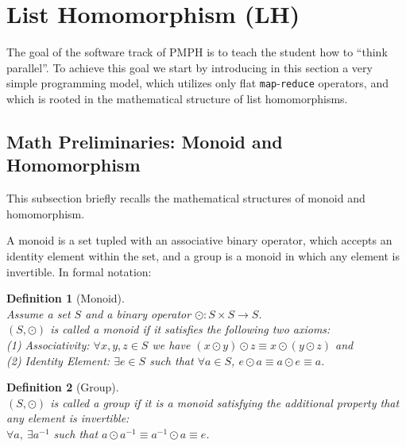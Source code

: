 \documentclass[acmsmall,review]{acmart}\settopmatter{printfolios=true,printccs=false,printacmref=false}
\newtheorem{mydef}{Definition}
\begin{document}
\section{List Homomorphism (LH)}
\label{sec:ListHom}

The goal of the software track of PMPH is to teach the student 
how to ``think parallel''. To achieve this goal we start by
introducing in this section a very simple programming model, 
which utilizes only flat \lstinline{map}-\lstinline{reduce} 
operators, and which is rooted in the mathematical structure 
of list homomorphisms.

\subsection{Math Preliminaries: Monoid and Homomorphism}

This subsection briefly recalls the mathematical structures of
monoid and homomorphism.

A monoid is a set tupled with an associative binary operator, which
accepts an identity element within the set, and a group is a monoid
in which any element is invertible. In formal notation:

\begin{mydef}[Monoid]\label{MonoidDef}
$\mbox{ }$\\
Assume a set $S$ and a binary operator $\odot : S \times S \rightarrow S$.\\
\emph{$(S, \odot)$ is called a monoid} if it satisfies the following two axioms:\\
\emph{(1) Associativity:} $\forall x,y,z\in S$ we have 
    $(x \odot y) \odot z \equiv x \odot (y \odot z)$ and\\
\emph{(2) Identity Element:} $\exists e \in S$ such that $\forall a \in S$, %
    $e \odot a \equiv a \odot e \equiv a$.\\\medskip
\end{mydef}

\begin{mydef}[Group]\label{GroupDef}
$\mbox{ }$\\
$(S,\odot)$ is called a group if it is a monoid satisfying the additional
property that any element is  invertible:\\ 
    $\forall a, ~\exists a^{-1}$ such that 
    $a\odot a^{-1}\equiv a^{-1}\odot a\equiv e$.
\end{mydef}
\end{document}
